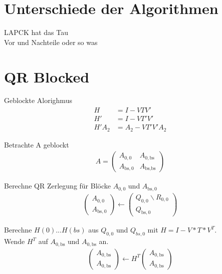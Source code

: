 \section{Unterschiede der Algorithmen}
LAPCK hat das Tau \\
Vor und Nachteile oder so was

\section{QR Blocked}
Geblockte Alorighmus
\begin{align}
H &= I - VTV'\\
H' &= I - VT'V'\\ 
H'A_2 &= A_2 - VT'V'A_2
\end{align}





Betrachte A geblockt
\begin{align}
	A = \left(\begin{array}{l|l}
	A_{0, 0} & A_{0, \text{bs}} \\ \hline
	A_{\text{bs}, 0}   & A_{\text{bs}, \text{bs}} 	
	\end{array} \right) 
\end{align}

Berechne QR Zerlegung für Blöcke $A_{0, 0}$ und $ A_{\text{bs},0}$
\begin{align}
	\left(\begin{array}{l} 
	A_{0, 0} \\ \hline
	A_{\text{bs}, 0}
	\end{array}\right)
	\leftarrow
	\left(\begin{array}{l} 
	Q_{0, 0}  \backslash R_{0,0} \\ \hline
	Q_{\text{bs}, 0} 
	\end{array}\right)
\end{align}

Berechne $H(0)$...$H(bs)$ aus $Q_{0, 0}$ und $Q_{bs, 0}$ mit $H = I - V*T*V^T$.\\
Wende $H^T$ auf $A_{0, \text{bs}}$ und $ A_{0,\text{bs}}$ an.
\begin{align}
	\left(\begin{array}{l} 
	A_{0, \text{bs}} \\ \hline
	A_{0, \text{bs}}
	\end{array}\right)
	\leftarrow
	H^T \left(\begin{array}{l} 
	A_{0, \text{bs}} \\ \hline
	A_{0, \text{bs}}
	\end{array}\right)
\end{align}



